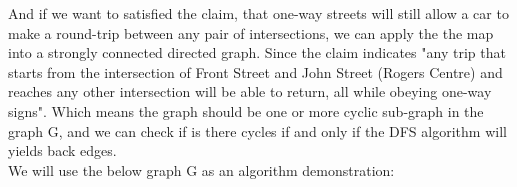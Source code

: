 \documentclass{article}
\begin{document}

\noindent And if we want to satisfied the claim, that one-way streets will still allow a car to make a round-trip between any pair of intersections, we can apply the the map into a strongly connected directed graph. Since the claim indicates "any trip that starts from the intersection of Front Street and John Street (Rogers Centre) and reaches any other intersection will be able to return, all while obeying one-way signs". Which means the graph should be one or more cyclic sub-graph in the graph G, and we can check if is there cycles if and only if the DFS algorithm will yields back edges.\\

\noindent We will use the below graph G as an algorithm demonstration:\\
\end{document}

